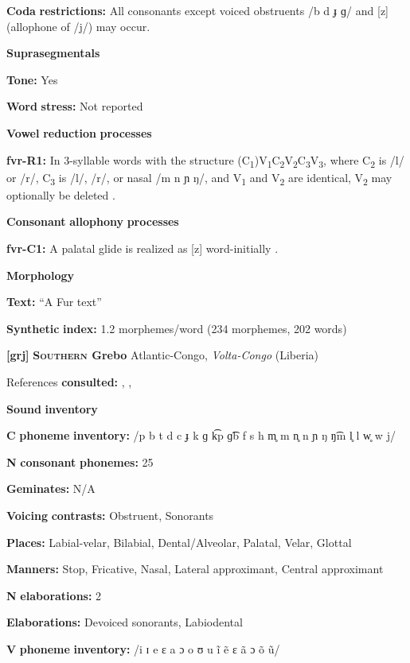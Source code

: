 \textbf{Coda} \textbf{restrictions:} All consonants except voiced obstruents /b d ɟ ɡ/ and [z] (allophone of /j/) may occur.

\textbf{Suprasegmentals}

\textbf{Tone:} Yes

\textbf{Word} \textbf{stress:} Not reported

\textbf{Vowel} \textbf{reduction} \textbf{processes}

\textbf{fvr-R1:} In 3-syllable words with the structure (C\textsubscript{1})V\textsubscript{1}C\textsubscript{2}V\textsubscript{2}C\textsubscript{3}V\textsubscript{3}, where C\textsubscript{2} is /l/ or /r/, C\textsubscript{3} is /l/, /r/, or nasal /m n ɲ ŋ/, and V\textsubscript{1} and V\textsubscript{2} are identical, V\textsubscript{2} may optionally be deleted \citep[60-61]{Jakobi1990}.

\textbf{Consonant} \textbf{allophony} \textbf{processes}

\textbf{fvr-C1:} A palatal glide is realized as [z] word-initially \citep[19]{Jakobi1990}.

\textbf{Morphology}

\textbf{Text:} “A Fur text” \citep[125-127]{Jakobi1990}

\textbf{Synthetic} \textbf{index:} 1.2 morphemes/word (234 morphemes, 202 words)

\textbf{[grj]}   \textbf{\textsc{Southern} \textbf{Grebo}}  Atlantic-Congo, \textit{Volta-Congo} (Liberia)

References \textbf{consulted:} \citet{Innes1966}, \citet{Innes1981}, \citet{Newman1986}

\textbf{Sound} \textbf{inventory}

\textbf{C} \textbf{phoneme} \textbf{inventory:} /p b t d c ɟ k ɡ k͡p ɡ͡b f s h m̥ m n̥ n ɲ ŋ ŋ͡m l̥ l w̥ w j/

\textbf{N} \textbf{consonant} \textbf{phonemes:} 25

\textbf{Geminates:} N/A

\textbf{Voicing} \textbf{contrasts:} Obstruent, Sonorants

\textbf{Places:} Labial-velar, Bilabial, Dental/Alveolar, Palatal, Velar, Glottal

\textbf{Manners:} Stop, Fricative, Nasal, Lateral approximant, Central approximant

\textbf{N} \textbf{elaborations:} 2

\textbf{Elaborations:} Devoiced sonorants, Labiodental

\textbf{V} \textbf{phoneme} \textbf{inventory:} /i ɪ e ɛ a ɔ o ʊ u ĩ ẽ ɛ ã ɔ õ ũ/

